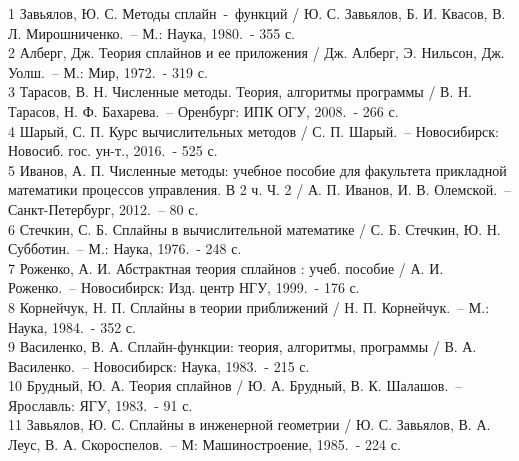 ﻿\documentclass[a4paper,14pt]{extreport}
\begin{document}
\begin{thebibliography}{}
1 Завьялов, Ю. С. Методы сплайн~-~функций / Ю. С. Завьялов, Б. И. Квасов, В. Л. Мирошниченко.~-- М.: Наука, 1980.~- 355 с.\\ 
2 Алберг, Дж. Теория сплайнов и ее приложения / Дж. Алберг, Э. Нильсон, Дж. Уолш.~-- М.: Мир, 1972.~- 319 с.\\ 
3 Тарасов, В. Н. Численные методы. Теория, алгоритмы программы / В. Н. Тарасов, Н. Ф. Бахарева.~-- Оренбург: ИПК ОГУ, 2008.~- 266 с. \\
4 Шарый, С. П. Курс вычислительных методов / С. П. Шарый.~-- Новосибирск: Новосиб. гос. ун-т., 2016.~- 525 с.\\
5 Иванов, А. П. Численные методы: учебное пособие для факультета прикладной математики процессов управления. В 2 ч. Ч. 2 / А. П. Иванов, И. В. Олемской.~-- Санкт-Петербург, 2012.~-- 80 с.\\
6 Стечкин, С. Б. Сплайны в вычислительной математике / С. Б. Стечкин, Ю. Н. Субботин.~-- М.: Наука, 1976.~- 248 с.\\
7 Роженко, А. И. Абстрактная теория сплайнов : учеб. пособие / А. И. Роженко.~-- Новосибирск: Изд. центр НГУ, 1999.~- 176 с.\\
8 Корнейчук, Н. П. Сплайны в теории приближений / Н. П. Корнейчук.~-- М.: Наука, 1984.~- 352 с.\\ 
9 Василенко, В. А. Сплайн-функции: теория, алгоритмы, программы / В. А. Василенко.~-- Новосибирск: Наука, 1983.~- 215 с.\\
10 Брудный, Ю. А. Теория сплайнов / Ю. А. Брудный, В. К. Шалашов.~-- Ярославль: ЯГУ, 1983.~- 91 с.\\
11 Завьялов, Ю. С. Сплайны в инженерной геометрии / Ю. С. Завьялов, В. А. Леус, В. А. Скороспелов.~-- М: Машиностроение, 1985.~- 224 с.\\
\end{thebibliography}
\end{document}
